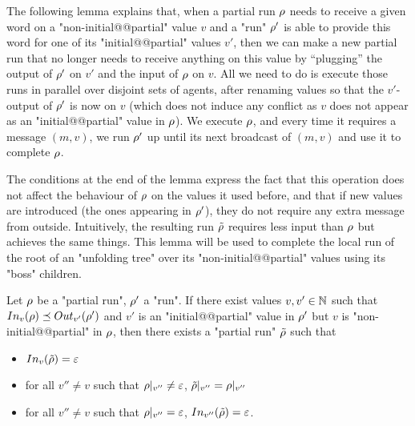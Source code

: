 The following lemma explains that, when a partial run $\rho$ needs to receive a given word on a "non-initial@@partial" value $v$ and a "run" $\rho'$ is able to provide this word for one of its "initial@@partial" values $v'$, then we can make a new partial run that no longer needs to receive anything on this value by ``plugging'' the output of $\rho'$ on $v'$ and the input of $\rho$ on $v$. All we need to do is execute those runs in parallel over disjoint sets of agents, after renaming values so that the $v'$-output of $\rho'$ is now on $v$ (which does not induce any conflict as $v$ does not appear as an "initial@@partial" value in $\rho$). We execute $\rho$, and every time it requires a message $(m,v)$, we run $\rho'$ up until its next broadcast of $(m,v)$ and use it to complete $\rho$.

The conditions at the end of the lemma express the fact that this operation does not affect the behaviour of $\rho$ on the values it used before, and that if new values are introduced (the ones appearing in $\rho'$), they do not require any extra message from outside. Intuitively, the resulting run $\Tilde{\rho}$ requires less input than $\rho$ but achieves the same things. This lemma will be used to complete the local run of the root of an "unfolding tree" over its "non-initial@@partial" values using its "boss" children. 

\begin{lemma}
	\label{lem:boss-composition}
	Let $\rho$ be a "partial run", $\rho'$ a "run".
	If there exist values $v, v' \in \mathbb{N}$ such that $\vinput{v}{\run} \subword \voutput{v'}{\run'}$ and $v'$ is an "initial@@partial" value in $\rho'$ but $v$ is "non-initial@@partial" in $\rho$, then there exists a "partial run" $\Tilde{\rho}$ such that 
	\begin{itemize}
		\item $\vinput{v}{\Tilde{\run}} = \varepsilon$ 
		
		\item for all $v'' \neq v$ such that ${\rho}|_{v''} \neq \varepsilon$, ${\Tilde{\rho}}|_{v''} = {\rho}|_{v''}$
		
		\item for all $v'' \neq v$ such that ${\rho}|_{v''} = \varepsilon$, $\vinput{v''}{\Tilde{\run}} = \varepsilon$.
	\end{itemize}
\end{lemma}

